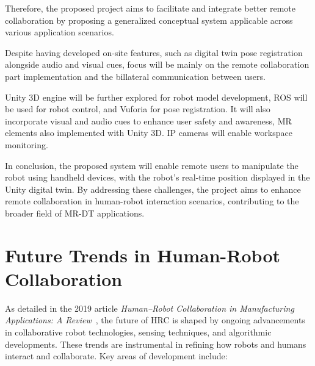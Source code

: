 Therefore, the proposed project aims to facilitate and integrate better remote collaboration by proposing a generalized conceptual system applicable across various application scenarios.

Despite having developed on-site features, such as digital twin pose registration alongside audio and visual cues, focus will be mainly on the remote collaboration part implementation and the billateral communication between users.

Unity 3D engine will be further explored for robot model development, \ac{ROS} will be used for robot control, and Vuforia for pose registration. It will also incorporate visual and audio cues to enhance user safety and awareness, \ac{MR} elements also implemented with Unity 3D. IP cameras will enable workspace monitoring. 

In conclusion, the proposed system will enable remote users to manipulate the robot using handheld devices, with the robot's real-time position displayed in the Unity digital twin. By addressing these challenges, the project aims to enhance remote collaboration in human-robot interaction scenarios, contributing to the broader field of \ac{MR}-\ac{DT} applications.





\section{Future Trends in Human-Robot Collaboration}

As detailed in the 2019 article \textit{Human–Robot Collaboration in Manufacturing Applications: A Review}~\cite{robotics8040100}, the future of \ac{HRC} is shaped by ongoing advancements in collaborative robot technologies, sensing techniques, and algorithmic developments. These trends are instrumental in refining how robots and humans interact and collaborate. Key areas of development include:

